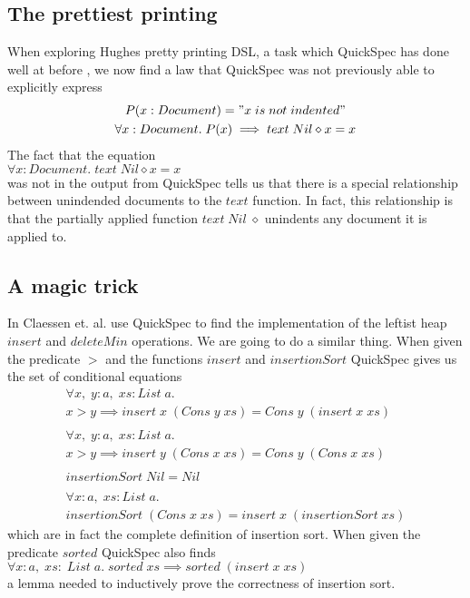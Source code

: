 \subsection{The prettiest printing}
    When exploring Hughes pretty printing DSL,\cite{Hughes1995}
    a task which QuickSpec has done well at before%
    , we now find a law that QuickSpec
    was not previously able to explicitly express
    \begin{gather*}
        P(x:Document) = "x\; is\; not\; indented"\\
        \forall x:Document.\; P(x)\implies text\;Nil\diamond x=x
    \end{gather*}
    The fact that the equation\\
    $\forall x:Document.\; text\;Nil\diamond x = x$\\
    was not in the output from QuickSpec tells us that there is a special
    relationship between unindended documents to the $text$ function. In fact, this relationship
    is that the partially applied function $text\;Nil\;\diamond$ unindents any document it is applied to. 

\subsection{A magic trick}
    In \cite{Claessen2010} Claessen et. al.
    use QuickSpec to find the implementation of the leftist
    heap $insert$ and $deleteMin$ operations. 
    We are going to do a similar thing. When given the predicate
    $>$ and the functions $insert$ and $insertionSort$ QuickSpec gives us
    the set of conditional equations
    \begin{gather*}
        \forall x,\;y:a,\; xs:List\; a.\\
        x > y \implies insert\; x\; (Cons\; y\; xs) = Cons\; y\; (insert\; x\; xs)\\\\
        \forall x,\;y:a,\; xs:List\; a.\\
        x > y \implies insert\; y\; (Cons\; x\; xs) = Cons\; y\; (Cons\; x\; xs)\\\\
        insertionSort\; Nil = Nil\\\\
        \forall x:a,\; xs:List\; a.\\
        insertionSort\; (Cons\; x\; xs) = insert\; x\; (insertionSort\; xs)
    \end{gather*}
    which are in fact the complete definition of insertion sort.
    When given the predicate $sorted$ QuickSpec also finds
    \\$\forall x:a,\; xs:\;List\;a.\; sorted\; xs \implies sorted\; (insert\; x\; xs)$\\
    a lemma needed to inductively prove the correctness of insertion sort.
